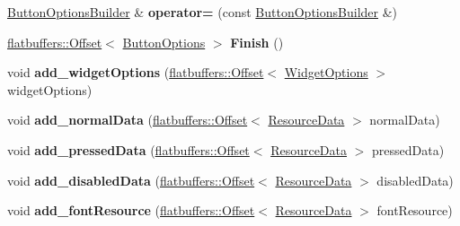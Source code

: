 \begin{DoxyCompactItemize}
\hyperlink{structflatbuffers_1_1ButtonOptionsBuilder}{Button\+Options\+Builder} \& {\bfseries operator=} (const \hyperlink{structflatbuffers_1_1ButtonOptionsBuilder}{Button\+Options\+Builder} \&)
\item 
\mbox{\label{structflatbuffers_1_1ButtonOptionsBuilder_ae15ef738f13d2b9b666d65aae0fcc1a0}} 
\hyperlink{structflatbuffers_1_1Offset}{flatbuffers\+::\+Offset}$<$ \hyperlink{structflatbuffers_1_1ButtonOptions}{Button\+Options} $>$ {\bfseries Finish} ()
\item 
\mbox{\label{structflatbuffers_1_1ButtonOptionsBuilder_a09fa54f6a950a737e970ccaa34700758}} 
void {\bfseries add\+\_\+widget\+Options} (\hyperlink{structflatbuffers_1_1Offset}{flatbuffers\+::\+Offset}$<$ \hyperlink{structflatbuffers_1_1WidgetOptions}{Widget\+Options} $>$ widget\+Options)
\item 
\mbox{\label{structflatbuffers_1_1ButtonOptionsBuilder_ac632c659c809d13675566c7476ce0a87}} 
void {\bfseries add\+\_\+normal\+Data} (\hyperlink{structflatbuffers_1_1Offset}{flatbuffers\+::\+Offset}$<$ \hyperlink{structflatbuffers_1_1ResourceData}{Resource\+Data} $>$ normal\+Data)
\item 
\mbox{\label{structflatbuffers_1_1ButtonOptionsBuilder_acad8adc94bf1f0ec8a95d0fe105415ab}} 
void {\bfseries add\+\_\+pressed\+Data} (\hyperlink{structflatbuffers_1_1Offset}{flatbuffers\+::\+Offset}$<$ \hyperlink{structflatbuffers_1_1ResourceData}{Resource\+Data} $>$ pressed\+Data)
\item 
\mbox{\label{structflatbuffers_1_1ButtonOptionsBuilder_aec4af1faa9d62b9703065a6b0e85e8ba}} 
void {\bfseries add\+\_\+disabled\+Data} (\hyperlink{structflatbuffers_1_1Offset}{flatbuffers\+::\+Offset}$<$ \hyperlink{structflatbuffers_1_1ResourceData}{Resource\+Data} $>$ disabled\+Data)
\item 
\mbox{\label{structflatbuffers_1_1ButtonOptionsBuilder_ab8696b14764b04cc8e0353ff98e53ae0}} 
void {\bfseries add\+\_\+font\+Resource} (\hyperlink{structflatbuffers_1_1Offset}{flatbuffers\+::\+Offset}$<$ \hyperlink{structflatbuffers_1_1ResourceData}{Resource\+Data} $>$ font\+Resource)

\end{DoxyCompactItemize}
